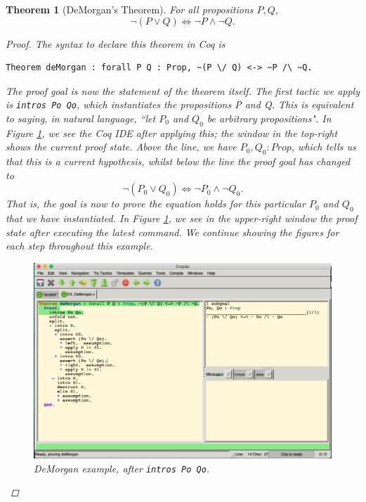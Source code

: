 \documentclass[12pt,notitlepage]{report}
\theoremstyle{plain}
\newtheorem{theo}{Theorem}[section]
\theoremstyle{definition}
\numberwithin{equation}{section}
\begin{document}
\begin{theo}[DeMorgan's Theorem]\label{DeMorgan}
    For all propositions $P, Q$,
    \[
        \neg (P \lor Q) \Longleftrightarrow \neg P \land \neg Q.
    \]
    \begin{proof} The syntax to declare this theorem in Coq is
    \begin{verbatim}Theorem deMorgan : forall P Q : Prop, ~(P \/ Q) <-> ~P /\ ~Q.\end{verbatim}
        The proof goal is now the statement of the theorem itself.  The first tactic we apply is 
        \texttt{intros Po Qo}, which \emph{instantiates} the propositions P and Q.  This is equivalent to saying, in natural language, ``let $P_0$ and $Q_0$ be arbitrary propositions".  In Figure \ref{fig:demorgan1st}, we see the Coq IDE after applying this; the window in the top-right shows the current proof state.  Above the line, we have $P_0, Q_0 : Prop$, which tells us that this is a current hypothesis, whilst below the line the proof goal has changed to 
        \[
        \neg (P_0 \lor Q_0) \Longleftrightarrow \neg P_0 \land \neg Q_0. \]
        That is, the goal is now to prove the equation holds for this particular $P_0$ and $Q_0$ that we have instantiated.  In Figure \ref{fig:demorgan1st}, we see in the upper-right window the proof state after executing the latest command.  We continue showing the figures for each step throughout this example.
        \par \medskip \noindent
\begin{figure}[H]
    \centering
          \includegraphics[scale=0.45]{DeMorgan}
              \caption{DeMorgan example, after \texttt{intros Po Qo}.}
    \label{fig:demorgan1st}
\end{figure}

\end{proof}
\end{theo}
\end{document}
